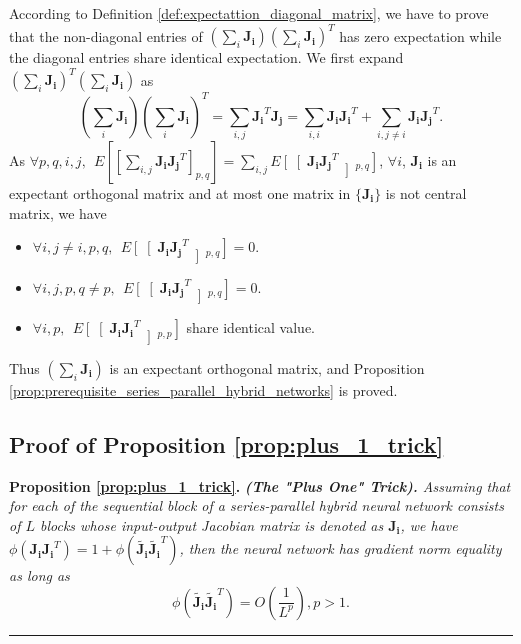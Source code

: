 \documentclass[10pt,journal,compsoc]{IEEEtran}
\begin{document}
According to Definition \ref{def:expectattion_diagonal_matrix}, we have to prove that the non-diagonal entries of $(\sum_i\mathbf{J_i})(\sum_i\mathbf{J_i})^T$ has zero expectation while the diagonal entries share identical expectation. We first expand $(\sum_i\mathbf{J_i})^T(\sum_i\mathbf{J_i})$ as
\begin{equation}
    (\sum_i\mathbf{J_i})(\sum_i\mathbf{J_i})^T=\sum_{i,j}\mathbf{J_i}^T\mathbf{J_j} = \sum_{i,i}\mathbf{J_i}\mathbf{J_i}^T + \sum_{i,j\neq i}\mathbf{J_i}\mathbf{J_j}^T.
\end{equation}
As $\forall p,q,i,j,~~E\left[\left[\sum_{i,j}\mathbf{J_i}\mathbf{J_j}^T\right]_{p,q}\right] = \sum_{i,j}E\left[\right[\mathbf{J_i}\mathbf{J_j}^T\left]_{p,q}\right]$, $\forall i$, $\mathbf{J_i}$ is an expectant orthogonal matrix and at most one matrix in $\{\mathbf{J_i}\}$ is not central matrix, we have
\begin{itemize}
    \item $\forall i, j\neq i, p,q,~~E\left[\right[\mathbf{J_i}\mathbf{J_j}^T\left]_{p,q}\right]=0$.
    \item $\forall i,j, p, q\neq p,~~E\left[\right[\mathbf{J_i}\mathbf{J_j}^T\left]_{p,q}\right]=0$.
    \item $\forall i,p, ~~E\left[\right[\mathbf{J_i}\mathbf{J_i}^T\left]_{p,p}\right]$ share identical value.
\end{itemize}
Thus $(\sum_i\mathbf{J_i})$ is an expectant orthogonal matrix, and Proposition \ref{prop:prerequisite_series_parallel_hybrid_networks} is proved.
 \subsection{Proof of Proposition \ref{prop:plus_1_trick}}\label{proof:plus_1_trick}

\textbf{Proposition \ref{prop:plus_1_trick}. }\textit{
\textbf{(The "Plus One" Trick). }Assuming that for each of the sequential block of a series-parallel hybrid neural network consists of $L$ blocks whose input-output Jacobian matrix is denoted as $\mathbf{J_i}$, we have $\phi(\mathbf{J_iJ_i}^T)=1+\phi(\widetilde{\mathbf{J_i}}\widetilde{\mathbf{J_i}}^T)$, then the neural network has gradient norm equality as long as}
\begin{equation}
    \phi(\widetilde{\mathbf{J_i}}\widetilde{\mathbf{J_i}}^T) = O(\frac{1}{L^p}), p>1.
\end{equation}
\rule[0pt]{0.48\textwidth}{0.05em}
\end{document}
